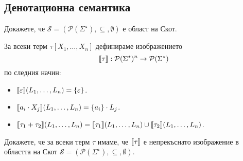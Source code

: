 \subsection{Денотационна семантика}

\begin{problem}
  Докажете, че $\mathcal{S} = (\mathcal{P}(\Sigma^\star), \subseteq, \emptyset)$ е област на Скот.
\end{problem}

За всеки терм $\tau[X_1,\dots,X_n]$ дефинираме изображението
\[\llbracket{\tau}\rrbracket: \mathcal{P}(\Sigma^\star)^n \to \mathcal{P}(\Sigma^\star)\]
 по следния начин:
\begin{itemize}
\item 
  $\llbracket{\varepsilon}\rrbracket(L_1,\dots,L_n) = \{\varepsilon\}$.
\item 
  $\llbracket{a_i \cdot X_j}\rrbracket(L_1,\dots,L_n) = \{a_i\} \cdot L_j$.
\item
  $\llbracket{\tau_1 + \tau_2}\rrbracket(L_1,\dots,L_n) = \llbracket{\tau_1}\rrbracket(L_1,\dots,L_n) \cup \llbracket{\tau_2}\rrbracket(L_1,\dots,L_n)$.
\end{itemize}

\begin{problem}
  Докажете, че за всеки терм $\tau$ имаме, че $\llbracket{\tau}\rrbracket$ е непрекъснато изображение в областта на Скот
  $\mathcal{S} = ( \mathcal{P}(\Sigma^\star),\subseteq, \emptyset)$.
\end{problem}


